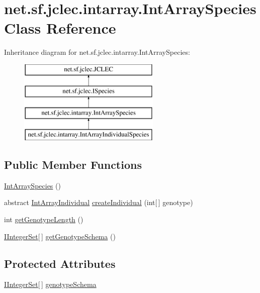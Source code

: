 \hypertarget{classnet_1_1sf_1_1jclec_1_1intarray_1_1_int_array_species}{\section{net.\-sf.\-jclec.\-intarray.\-Int\-Array\-Species Class Reference}
\label{classnet_1_1sf_1_1jclec_1_1intarray_1_1_int_array_species}
}
Inheritance diagram for net.\-sf.\-jclec.\-intarray.\-Int\-Array\-Species\-:\begin{figure}[H]
\begin{center}
\leavevmode
\includegraphics[height=4.000000cm]{classnet_1_1sf_1_1jclec_1_1intarray_1_1_int_array_species}
\end{center}
\end{figure}
\subsection*{Public Member Functions}
\begin{DoxyCompactItemize}
\item 
\hyperlink{classnet_1_1sf_1_1jclec_1_1intarray_1_1_int_array_species_ad2d65094b404c0965ac48c469f0d282a}{Int\-Array\-Species} ()
\item 
abstract \hyperlink{classnet_1_1sf_1_1jclec_1_1intarray_1_1_int_array_individual}{Int\-Array\-Individual} \hyperlink{classnet_1_1sf_1_1jclec_1_1intarray_1_1_int_array_species_abd6f2090b12a74d92dbc233075ab71ff}{create\-Individual} (int\mbox{[}$\,$\mbox{]} genotype)
\item 
int \hyperlink{classnet_1_1sf_1_1jclec_1_1intarray_1_1_int_array_species_ab71bcf5ac8dd8c1baa5fc7e5672ac7dc}{get\-Genotype\-Length} ()
\item 
\hyperlink{interfacenet_1_1sf_1_1jclec_1_1util_1_1intset_1_1_i_integer_set}{I\-Integer\-Set}\mbox{[}$\,$\mbox{]} \hyperlink{classnet_1_1sf_1_1jclec_1_1intarray_1_1_int_array_species_a67e9c6a66dfe4cafd666c38c0806bbdc}{get\-Genotype\-Schema} ()
\end{DoxyCompactItemize}
\subsection*{Protected Attributes}
\begin{DoxyCompactItemize}
\item 
\hyperlink{interfacenet_1_1sf_1_1jclec_1_1util_1_1intset_1_1_i_integer_set}{I\-Integer\-Set}\mbox{[}$\,$\mbox{]} \hyperlink{classnet_1_1sf_1_1jclec_1_1intarray_1_1_int_array_species_a715c2117e4b1c70ab004accbf15848b7}{genotype\-Schema}
\end{DoxyCompactItemize}


